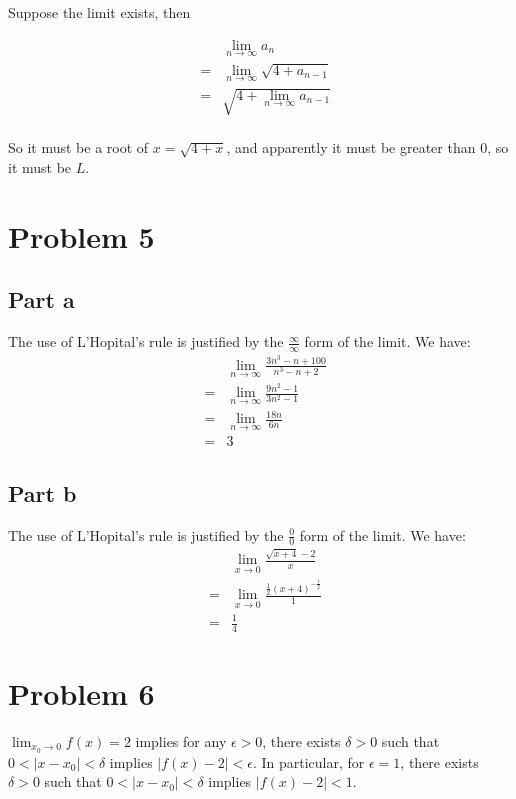 \documentclass{article}
\begin{document}
Suppose the limit exists, then 

\begin{eqnarray*}
  & & \lim_{n \to \infty} a_n \\
  &=& \lim_{n \to \infty} \sqrt{4 + a_{n-1}} \\
  &=& \sqrt{4 + \lim_{n \to \infty} a_{n-1}} \\
\end{eqnarray*}

So it must be a root of $ x = \sqrt{4 + x} $, and apparently it must be greater than 0, so it must be $ L $.

\section*{Problem 5}
\subsection*{Part a}
The use of L'Hopital's rule is justified by the $ \frac{\infty}{\infty} $ form of the limit. We have:
\begin{eqnarray*}
  & & \lim_{n \to \infty}\frac{3n^3 - n + 100}{n^3 - n + 2} \\
  &=& \lim_{n \to \infty}\frac{9n^2 - 1}{3n^2 - 1} \\
  &=& \lim_{n \to \infty}\frac{18n}{6n} \\
  &=& 3 
\end{eqnarray*}

\subsection*{Part b}
The use of L'Hopital's rule is justified by the $ \frac{0}{0} $ form of the limit. We have:
\begin{eqnarray*}
  & & \lim_{x \to 0}\frac{\sqrt{x + 4} - 2}{x} \\
  &=& \lim_{x \to 0}\frac{\frac{1}{2}(x + 4)^{-\frac{1}{2}}}{1} \\
  &=& \frac{1}{4} 
\end{eqnarray*}

\section*{Problem 6}
$ \lim_{x_0 \to 0} f(x) = 2 $ implies for any $ \epsilon > 0 $, there exists $ \delta > 0 $ such that $ 0 < |x - x_0| < \delta $ implies $ |f(x) - 2| < \epsilon $. In particular, for $ \epsilon = 1 $, there exists $ \delta > 0 $ such that $ 0 < |x - x_0| < \delta $ implies $ |f(x) - 2| < 1 $.
\end{document}
